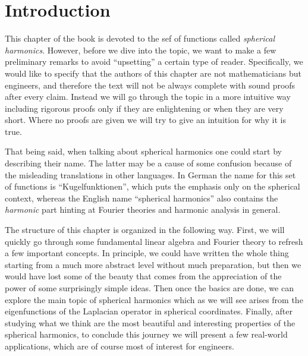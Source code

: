 
\section{Introduction}

This chapter of the book is devoted to the sef of functions called
\emph{spherical harmonics}. However, before we dive into the topic, we want to
make a few preliminary remarks to avoid ``upsetting'' a certain type of
reader. Specifically, we would like to specify that the authors of this
chapter are not mathematicians but engineers, and therefore the text will not be
always complete with sound proofs after every claim. Instead we will go
through the topic in a more intuitive way including rigorous proofs only if
they are enlightening or when they are very short. Where no proofs are given
we will try to give an intuition for why it is true.

That being said, when talking about spherical harmonics one could start by
describing their name. The latter may be a cause of some confusion because of
the misleading translations in other languages. In German the name for this
set of functions is ``Kugelfunktionen'', which puts the emphasis only on the
spherical context, whereas the English name ``spherical harmonics'' also
contains the \emph{harmonic} part hinting at Fourier theories and harmonic
analysis in general.

The structure of this chapter is organized in the following way. First, we
will quickly go through some fundamental linear algebra and Fourier theory to
refresh a few important concepts. In principle, we could have written the
whole thing starting from a much more abstract level without much preparation,
but then we would have lost some of the beauty that comes from the
appreciation of the power of some surprisingly simple ideas. Then once the
basics are done, we can explore the main topic of spherical harmonics which as
we will see arises from the eigenfunctions of the Laplacian operator in
spherical coordinates. Finally, after studying what we think are the most
beautiful and interesting properties of the spherical harmonics, to conclude
this journey we will present a few real-world applications, which are of
course most of interest for engineers.

